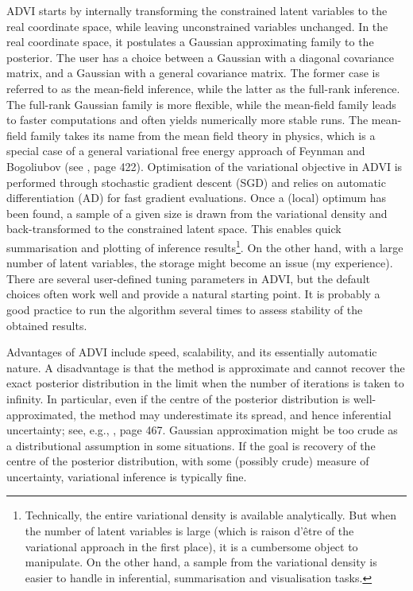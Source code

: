 \documentclass[]{article}
\begin{document}
ADVI starts by internally transforming the constrained latent variables to the real coordinate space, while leaving unconstrained variables unchanged. In the real coordinate space, it postulates a Gaussian approximating family to the posterior. The user has a choice between a Gaussian with a diagonal covariance matrix, and a Gaussian with a general covariance matrix. The former case is referred to as the mean-field inference, while the latter as the full-rank inference. The full-rank Gaussian family is more flexible, while the mean-field family leads to faster computations and often yields numerically more stable runs. The mean-field family takes its name from the mean field theory in physics, which is a special case of a general variational free energy approach of Feynman and Bogoliubov (see \citet{mackay2003}, page 422). Optimisation of the variational objective in ADVI is performed through stochastic gradient descent (SGD) and relies on automatic differentiation (AD) for fast gradient evaluations. Once a (local) optimum has been found, a sample of a given size is drawn from the variational density and back-transformed to the constrained latent space. This enables quick summarisation and plotting of inference results\footnote{Technically, the entire variational density is available analytically. But when the number of latent variables is large (which is raison d'\^{e}tre of the variational approach in the first place), it is a cumbersome object to manipulate. On the other hand, a sample from the variational density is easier to handle in inferential, summarisation and visualisation tasks.}. On the other hand, with a large number of latent variables, the storage might become an issue (my experience). There are several user-defined tuning parameters in ADVI, but the default choices often work well and provide a natural starting point. It is probably a good practice to run the algorithm several times to assess stability of the obtained results.

Advantages of ADVI include speed, scalability, and its essentially automatic nature. A disadvantage is that the method is approximate and cannot recover the exact posterior distribution in the limit when the number of iterations is taken to infinity. In particular, even if the centre of the posterior distribution is well-approximated, the method may underestimate its spread, and hence inferential uncertainty; see, e.g., \cite{bishop2006}, page 467. Gaussian approximation might be too crude as a distributional assumption in some situations. If the goal is recovery of the centre of the posterior distribution, with some (possibly crude) measure of uncertainty, variational inference is typically fine.
\end{document}

